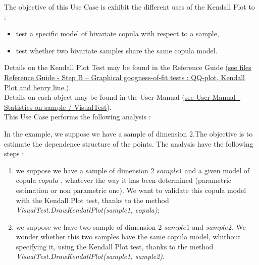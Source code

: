 \renewcommand{\filename}{docUC_InputWithData_CopulaKendallPlotTest.tex}
\renewcommand{\filetitle}{UC : Validating a Copula with the Kendall Plot Test}

\HeaderIIILevel


\label{copula_validation}





The objective of this Use Case is exhibit the different uses of the Kendall Plot to :
\begin{itemize}
\item test a specific model of bivariate copula with respect to a sample, 
\item test whether two bivariate samples share the same copula model.
\end{itemize}


Details on the Kendall Plot Test may be found in the Reference Guide (\href{OpenTURNS_ReferenceGuide.pdf}{see files Reference Guide - Step B -- Graphical googness-of-fit tests : QQ-plot, Kendall Plot and henry line.}).\\

Details on each object may be found in the User Manual  (\href{OpenTURNS_UserManual_TUI.pdf}{see User Manual - Statistics on sample /  VisualTest}).\\

This Use Case performs the following analysis :

In the example, we suppose we have a sample of dimension 2.The objective is to estimate the dependence structure of the points. The analysis  have the following steps :
\begin{enumerate}
\item  we suppose we have a sample of dimension 2 $sample1$ and a given model of copula $copula$ , whatever the way it has been determined (parametric estimation or non parametric one). We want to validate this copula model with the Kendall Plot test, thanks to the method \emph{VisualTest.DrawKendallPlot(sample1, copula)};
\item we suppose we have two sample of dimension 2 $sample1$ and $sample2$. We wonder whether this two samples have the same copula model, whithout specifying it, using the Kendall Plot test, thanks to the method \emph{VisualTest.DrawKendallPlot(sample1, sample2)}.
\end{enumerate}

